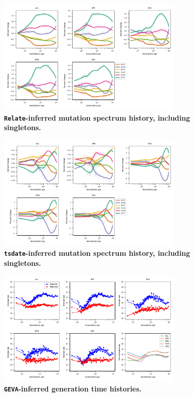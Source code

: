 \documentclass[]{article}
\newcommand{\GEVA}{\texttt{GEVA}\xspace}
\newcommand{\tsdate}{\texttt{tsdate}\xspace}
\newcommand{\relate}{\texttt{Relate}\xspace}
\begin{document}
\begin{figure}[ht!]
    \centering
    \includegraphics[width=0.8\textwidth]{../plots/spectrum_history.relate.max_age.10000.singletons.pdf}
    \caption{
        \textbf{\relate-inferred mutation spectrum history, including singletons.}
    }
    \label{fig:relate-spectra-singletons}
\end{figure}


\begin{figure}[ht!]
    \centering
    \includegraphics[width=0.8\textwidth]{../plots/spectrum_history.tsdate.max_age.10000.singletons.pdf}
    \caption{
        \textbf{\tsdate-inferred mutation spectrum history, including singletons.}
    }
    \label{fig:tsdate-spectra-singletons}
\end{figure}


\begin{figure}[ht!]
    \centering
    \includegraphics[width=0.8\textwidth]{../plots/inferred_generation_times.DM.geva.max_age.10000.pdf}
    \caption{
        \textbf{\GEVA-inferred generation time histories.}
    }
    \label{fig:geva-gen-times}
\end{figure}
\end{document}
